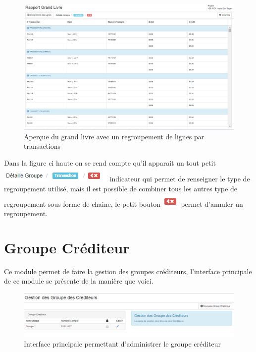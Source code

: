 \documentclass[12pt,a4paper]{report}
\begin{document}
\begin{figure}[h]
\begin{center}
\includegraphics[width=14cm]{pic/GrandLivreParTransact.png}
\end{center}
\caption{Aperçue du grand livre avec un regroupement de lignes par transactions}
\label{Aperçue du grand livre avec un regroupement de lignes par transactions}
\end{figure}

Dans la figure ci haute on se rend compte qu'il apparait un tout petit \includegraphics[scale=0.7]{pic/detailleRegroupement.png} indicateur qui permet de renseigner le type de regroupement utilisé, mais il est possible de combiner tous les autres type de regroupement sous forme de chaine, le petit bouton \includegraphics[scale=0.7]{pic/AnnulerRegroupement.png} permet d'annuler un regroupement.


\newpage
\section{Groupe Créditeur}
Ce module permet de faire la gestion des groupes créditeurs, l'interface principale de ce module se présente de la manière que voici.

\begin{figure}[h]
\begin{center}
\includegraphics[width=12cm]{pic/AdminGroupCredit.png}
\end{center}
\caption{Interface principale permettant d'administrer le groupe créditeur}
\label{Interface principale permettant d'administrer le groupe créditeur}
\end{figure}
\end{document}
